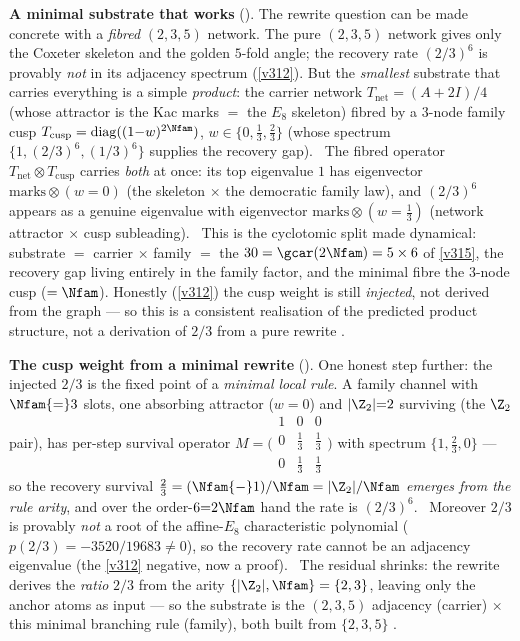 \par\smallskip\noindent\textbf{A minimal substrate that works}
(). The rewrite question can be made concrete with a \emph{fibred} $(2,3,5)$
network. The pure $(2,3,5)$ network gives only
the Coxeter skeleton and the golden $5$-fold angle; the recovery rate $(2/3)^6$ is provably \emph{not} in its
adjacency spectrum (\vref{v312}). But the \emph{smallest} substrate that carries everything is a simple
\emph{product}: the carrier network $T_{\mathrm{net}}=(A{+}2I)/4$ (whose attractor is the Kac marks $=$ the $E_8$
skeleton) fibred by a $3$-node family cusp $T_{\mathrm{cusp}}=\operatorname{diag}((1{-}w)^{2\Nfam})$,
$w\in\{0,\tfrac13,\tfrac23\}$ (whose spectrum $\{1,(2/3)^6,(1/3)^6\}$ supplies the recovery gap). \mE\ The fibred
operator $T_{\mathrm{net}}\otimes T_{\mathrm{cusp}}$ carries \emph{both} at once: its top eigenvalue $1$ has
eigenvector $\mathrm{marks}\otimes(w{=}0)$ (the skeleton $\times$ the democratic family law), and $(2/3)^6$ appears
as a genuine eigenvalue with eigenvector $\mathrm{marks}\otimes(w{=}\tfrac13)$ (network attractor $\times$ cusp
subleading). \mE\ This is the cyclotomic split made dynamical: substrate $=$ carrier $\times$ family $=$ the
$30=\gcar(2\Nfam)=5\times6$ of \vref{v315}, the recovery gap living entirely in the family factor, and the minimal
fibre the $3$-node cusp ($=\Nfam$). Honestly (\vref{v312}) the cusp weight is still \emph{injected}, not derived from
the graph --- so this is a consistent realisation of the predicted product structure, not a derivation of $2/3$ from
a pure rewrite \mC.

\par\smallskip\noindent\textbf{The cusp weight from a minimal rewrite}
(). One honest step further: the injected $2/3$ is the fixed point of a
\emph{minimal local rule}. A family channel with $\Nfam{=}3$ slots, one absorbing attractor ($w{=}0$) and
$|\Z_2|{=}2$ surviving (the $\Z_2$ pair), has per-step survival operator
$M=\bigl(\begin{smallmatrix}1&0&0\\0&\frac13&\frac13\\0&\frac13&\frac13\end{smallmatrix}\bigr)$ with spectrum
$\{1,\tfrac23,0\}$ --- so the recovery survival $\tfrac23=(\Nfam{-}1)/\Nfam=|\Z_2|/\Nfam$ \emph{emerges from the
rule arity}, and over the order-$6{=}2\Nfam$ hand the rate is $(2/3)^6$. \mE\ Moreover $2/3$ is provably \emph{not}
a root of the affine-$E_8$ characteristic polynomial ($p(2/3)=-3520/19683\ne0$), so the recovery rate cannot be an
adjacency eigenvalue (the \vref{v312} negative, now a proof). \mO\ The residual shrinks: the rewrite derives the
\emph{ratio} $2/3$ from the arity $\{|\Z_2|,\Nfam\}=\{2,3\}$, leaving only the anchor atoms as input --- so the
substrate is the $(2,3,5)$ adjacency (carrier) $\times$ this minimal branching rule (family), both built from
$\{2,3,5\}$ \mC.

